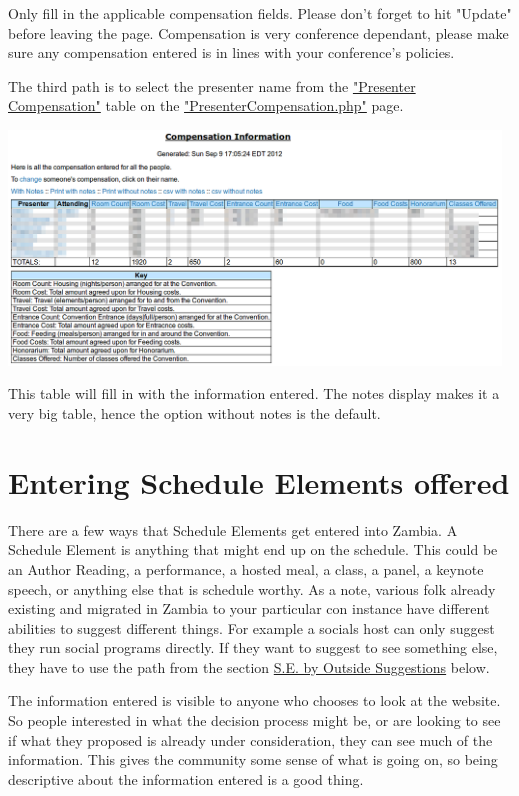\documentclass[captions=tablesignature]{scrartcl}
\begin{document}
Only fill in the applicable compensation fields.  Please don't
forget to hit "Update" before leaving the page.  Compensation is
very conference dependant, please make sure any compensation entered
is in lines with your conference's policies.

The third path is to select the presenter name from the
\href{../webpages/PresenterCompensation.php}{"Presenter Compensation"} table on the \href{../webpages/PresenterCompensation.php}{"PresenterCompensation.php"}
page.


\includegraphics[width=0.98\textwidth]{./Images/Compensation_Information.png}

This table will fill in with the information entered.  The notes
display makes it a very big table, hence the option without notes is
the default.
\section{Entering Schedule Elements offered}
\label{sec-5}

There are a few ways that Schedule Elements get entered into Zambia.
A Schedule Element is anything that might end up on the schedule.
This could be an Author Reading, a performance, a hosted meal, a
class, a panel, a keynote speech, or anything else that is schedule
worthy. As a note, various folk already existing and migrated in
Zambia to your particular con instance have different abilities to
suggest different things.  For example a socials host can only
suggest they run social programs directly.  If they want to suggest
to see something else, they have to use the path from the section
\hyperref[sec-5-1]{S.E. by Outside Suggestions} below.

The information entered is visible to anyone who chooses to look at
the website.  So people interested in what the decision process
might be, or are looking to see if what they proposed is already
under consideration, they can see much of the information.  This
gives the community some sense of what is going on, so being
descriptive about the information entered is a good thing.
\end{document}

